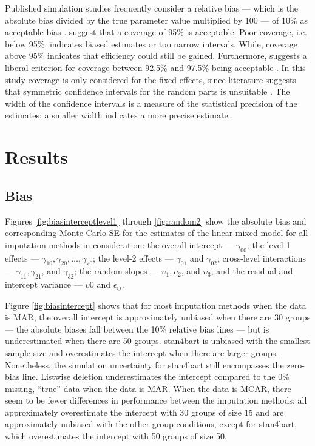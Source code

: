 \documentclass[3p,12pt,a4paper]{elsarticle}
\begin{document}
Published simulation studies frequently consider a relative bias --- which is the absolute bias divided by the true parameter value multiplied by 100 --- of 10\% as acceptable bias \citep{enders2018,enders2018a,enders2020,finch1997}. \citet{morris2019,enders2018,oberman2023,buurenFlexibleImputationMissing2018} suggest that a coverage of 95\% is acceptable. Poor coverage, i.e. below 95\%, indicates biased estimates or too narrow intervals. While, coverage above 95\% indicates that efficiency could still be gained. Furthermore, \citet{bradley1978} suggests a liberal criterion for coverage between 92.5\% and 97.5\% being acceptable \citep{enders2018,enders2018a,enders2020}. In this study coverage is only considered for the fixed effects, since literature suggests that symmetric confidence intervals for the random parts is unsuitable \citep{enders2018,enders2018a,enders2020,maas2005}.
The width of the confidence intervals is a measure of the statistical precision of the estimates: a smaller width indicates a more precise estimate \citep{oberman2023,buurenFlexibleImputationMissing2018}.

\section{Results}
\graphicspath{{./graphs/}}
\subsection{Bias}
Figures \ref{fig:biasinterceptlevel1} through \ref{fig:random2} show the absolute bias and corresponding Monte Carlo SE for the estimates of the linear mixed model for all imputation methods in consideration: the overall intercept --- $\gamma_{00}$; the level-1 effects --- $\gamma_{10}, \gamma_{20},\dots,\gamma_{70}$; the level-2 effects --- $\gamma_{01}$ and $\gamma_{02}$; cross-level interactions --- $\gamma_{11}, \gamma_{21}$, and $\gamma_{32}$; the random slopes --- $\upsilon_{1}, \upsilon_{2}$, and $\upsilon_{3}$; and the residual and intercept variance --- $\upsilon{0}$ and $\epsilon_{ij}$.

Figure \ref{fig:biasintercept} shows that for most imputation methods when the data is MAR, the overall intercept is approximately unbiased when there are 30 groups --- the absolute biases fall between the 10\% relative bias lines --- but is underestimated when there are 50 groups. stan4bart is unbiased with the smallest sample size and overestimates the intercept when there are larger groups. Nonetheless, the simulation uncertainty for stan4bart still encompasses the zero-bias line. Listwise deletion underestimates the intercept compared to the 0\% missing, ``true'' data when the data is MAR.  
When the data is MCAR, there seem to be fewer differences in performance between the imputation methods: all approximately overestimate the intercept with 30 groups of size 15 and are approximately unbiased with the other group conditions, except for stan4bart, which overestimates the intercept with 50 groups of size 50. 
\end{document}
